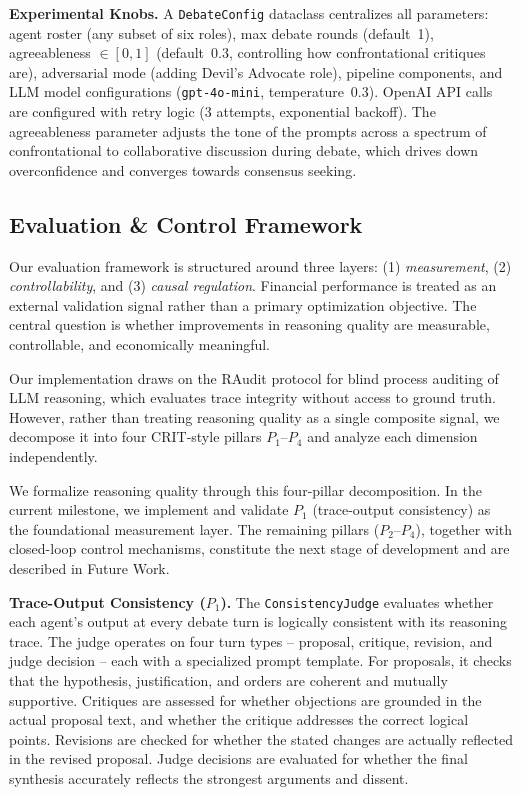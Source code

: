 \documentclass{article}
\begin{document}
\textbf{Experimental Knobs.}
A \texttt{DebateConfig} dataclass centralizes all parameters: agent roster (any subset of six roles), max debate rounds (default~1), agreeableness $\in [0,1]$ (default~0.3, controlling how confrontational critiques are), adversarial mode (adding Devil's Advocate role), pipeline components, and LLM model configurations (\texttt{gpt-4o-mini}, temperature~0.3). OpenAI API calls are configured with retry logic (3 attempts, exponential backoff). The agreeableness parameter adjusts the tone of the prompts across a spectrum of confrontational to collaborative discussion during debate, which drives down overconfidence and converges towards consensus seeking.


\subsection{Evaluation \& Control Framework}

Our evaluation framework is structured around three layers: 
(1) \emph{measurement}, 
(2) \emph{controllability}, and 
(3) \emph{causal regulation}. 
Financial performance is treated as an external validation signal rather than a primary optimization objective. 
The central question is whether improvements in reasoning quality are 
measurable, controllable, and economically meaningful.

Our implementation draws on the RAudit protocol \citep{raudit} for blind process auditing of LLM reasoning, 
which evaluates trace integrity without access to ground truth. 
However, rather than treating reasoning quality as a single composite signal, 
we decompose it into four CRIT-style pillars $P_1$–$P_4$ 
\citep{chang2023crit} and analyze each dimension independently.

We formalize reasoning quality through this four-pillar decomposition. 
In the current milestone, we implement and validate $P_1$ 
(trace-output consistency) as the foundational measurement layer. 
The remaining pillars ($P_2$–$P_4$), together with closed-loop control mechanisms, 
constitute the next stage of development and are described in Future Work.



\textbf{Trace-Output Consistency ($P_1$).}
The \texttt{ConsistencyJudge} evaluates whether each agent's output at every debate turn is logically consistent with its reasoning trace. The judge operates on four turn types -- proposal, critique, revision, and judge decision -- each with a specialized prompt template. For proposals, it checks that the hypothesis, justification, and orders are coherent and mutually supportive. Critiques are assessed for whether objections are grounded in the actual proposal text, and whether the critique addresses the correct logical points. Revisions are checked for whether the stated changes are actually reflected in the revised proposal. Judge decisions are evaluated for whether the final synthesis accurately reflects the strongest arguments and dissent.
\end{document}
